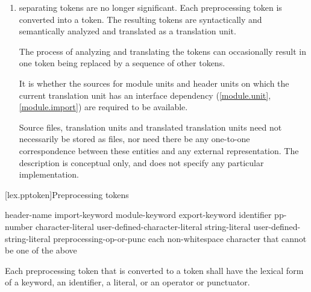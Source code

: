 \documentclass{wg21}
\newcommand{\cwhitespaces}[1]{\removed{#1} \added{\grammarterm{whitespace}}}
\begin{document}
\begin{enumerate}
    \item \cwhitespaces{Whitespace characters} separating tokens are no longer
    significant. Each preprocessing token is converted into a
    token. The resulting tokens are syntactically and
    semantically analyzed and translated as a translation unit.
    \begin{note}
        The process of analyzing and translating the tokens can occasionally
        result in one token being replaced by a sequence of other
        tokens.
    \end{note}
    It is
    whether the sources for
    module units and header units
    on which the current translation unit has an interface
    dependency (\ref{module.unit}, \ref{module.import})
    are required to be available.
    \begin{note}
        Source files, translation
        units and translated translation units need not necessarily be stored as
        files, nor need there be any one-to-one correspondence between these
        entities and any external representation. The description is conceptual
        only, and does not specify any particular implementation.
    \end{note}
\end{enumerate}

[lex.pptoken]{Preprocessing tokens}

%
\begin{bnf}
    \br
    header-name\br
    import-keyword\br
    module-keyword\br
    export-keyword\br
    identifier\br
    pp-number\br
    character-literal\br
    user-defined-character-literal\br
    string-literal\br
    user-defined-string-literal\br
    preprocessing-op-or-punc\br
    \textnormal{each non-whitespace character that cannot be one of the above}
\end{bnf}

\pnum
Each preprocessing token that is converted to a token
shall have the lexical form of a keyword, an identifier, a literal,
or an operator or punctuator.
\end{document}
